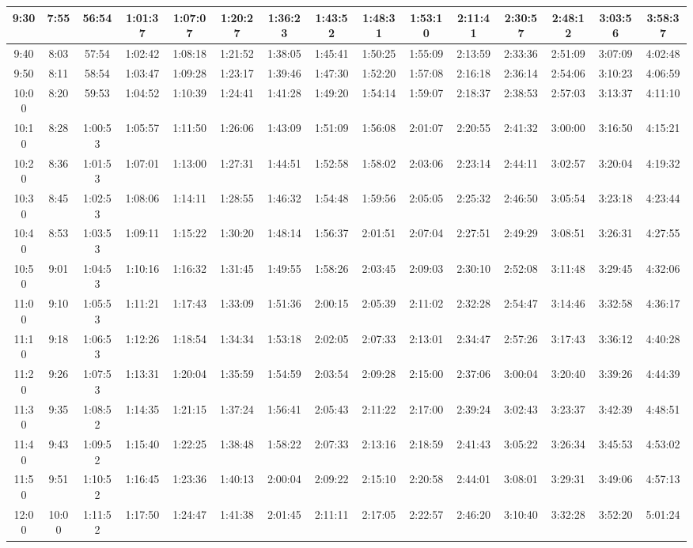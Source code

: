 \begin{scriptsize}
\begin{tabular}{c | c | c | c | c | c | c | c | c | c | c | c | c | c | c}
		9:30&7:55&56:54&1:01:37&1:07:07&1:20:27&1:36:23&1:43:52&1:48:31&1:53:10&2:11:41&2:30:57&2:48:12&3:03:56&3:58:37\\\hline
		9:40&8:03&57:54&1:02:42&1:08:18&1:21:52&1:38:05&1:45:41&1:50:25&1:55:09&2:13:59&2:33:36&2:51:09&3:07:09&4:02:48\\\hline
		9:50&8:11&58:54&1:03:47&1:09:28&1:23:17&1:39:46&1:47:30&1:52:20&1:57:08&2:16:18&2:36:14&2:54:06&3:10:23&4:06:59\\\hline
		10:00&8:20&59:53&1:04:52&1:10:39&1:24:41&1:41:28&1:49:20&1:54:14&1:59:07&2:18:37&2:38:53&2:57:03&3:13:37&4:11:10\\\hline
		10:10&8:28&1:00:53&1:05:57&1:11:50&1:26:06&1:43:09&1:51:09&1:56:08&2:01:07&2:20:55&2:41:32&3:00:00&3:16:50&4:15:21\\\hline
		10:20&8:36&1:01:53&1:07:01&1:13:00&1:27:31&1:44:51&1:52:58&1:58:02&2:03:06&2:23:14&2:44:11&3:02:57&3:20:04&4:19:32\\\hline
		10:30&8:45&1:02:53&1:08:06&1:14:11&1:28:55&1:46:32&1:54:48&1:59:56&2:05:05&2:25:32&2:46:50&3:05:54&3:23:18&4:23:44\\\hline
		10:40&8:53&1:03:53&1:09:11&1:15:22&1:30:20&1:48:14&1:56:37&2:01:51&2:07:04&2:27:51&2:49:29&3:08:51&3:26:31&4:27:55\\\hline
		10:50&9:01&1:04:53&1:10:16&1:16:32&1:31:45&1:49:55&1:58:26&2:03:45&2:09:03&2:30:10&2:52:08&3:11:48&3:29:45&4:32:06\\\hline
		11:00&9:10&1:05:53&1:11:21&1:17:43&1:33:09&1:51:36&2:00:15&2:05:39&2:11:02&2:32:28&2:54:47&3:14:46&3:32:58&4:36:17\\\hline
		11:10&9:18&1:06:53&1:12:26&1:18:54&1:34:34&1:53:18&2:02:05&2:07:33&2:13:01&2:34:47&2:57:26&3:17:43&3:36:12&4:40:28\\\hline
		11:20&9:26&1:07:53&1:13:31&1:20:04&1:35:59&1:54:59&2:03:54&2:09:28&2:15:00&2:37:06&3:00:04&3:20:40&3:39:26&4:44:39\\\hline
		11:30&9:35&1:08:52&1:14:35&1:21:15&1:37:24&1:56:41&2:05:43&2:11:22&2:17:00&2:39:24&3:02:43&3:23:37&3:42:39&4:48:51\\\hline
		11:40&9:43&1:09:52&1:15:40&1:22:25&1:38:48&1:58:22&2:07:33&2:13:16&2:18:59&2:41:43&3:05:22&3:26:34&3:45:53&4:53:02\\\hline
		11:50&9:51&1:10:52&1:16:45&1:23:36&1:40:13&2:00:04&2:09:22&2:15:10&2:20:58&2:44:01&3:08:01&3:29:31&3:49:06&4:57:13\\\hline
		12:00&10:00&1:11:52&1:17:50&1:24:47&1:41:38&2:01:45&2:11:11&2:17:05&2:22:57&2:46:20&3:10:40&3:32:28&3:52:20&5:01:24\\\hline
\end{tabular}\end{scriptsize}\newpage

